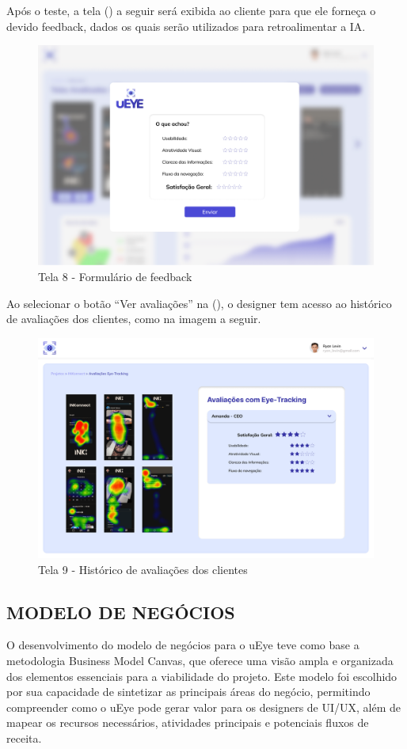 Após o teste, a tela () a seguir será exibida ao cliente para que ele forneça o devido feedback, dados os quais serão utilizados para retroalimentar a IA.

\begin{figure}[H]
    \centering
    \caption{Tela 8 - Formulário de feedback}%
    \label{fig:pg-tela8}
    \includegraphics[width=0.72\linewidth]{Illustrations/tela8.png}
\end{figure}

Ao selecionar o botão “Ver avaliações” na (), o designer tem acesso ao histórico de avaliações dos clientes, como na imagem a seguir.

\begin{figure}[H]
    \centering
    \caption{Tela 9 - Histórico de avaliações dos clientes}%
    \label{fig:pg-tela9}
    \includegraphics[width=0.72\linewidth]{Illustrations/tela9.png}
\end{figure}

\subsection*{MODELO DE NEGÓCIOS}
O desenvolvimento do modelo de negócios para o uEye teve como base a metodologia Business Model Canvas, que oferece uma visão ampla e organizada dos elementos essenciais para a viabilidade do projeto. Este modelo foi escolhido por sua capacidade de sintetizar as principais áreas do negócio, permitindo compreender como o uEye pode gerar valor para os designers de UI/UX, além de mapear os recursos necessários, atividades principais e potenciais fluxos de receita.

